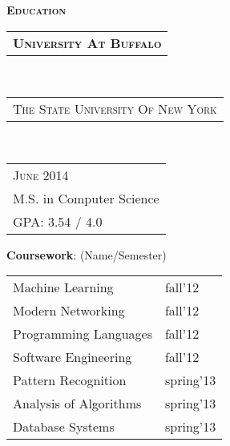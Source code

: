 \documentclass[10pt,a4paper,oneside]{article}
\begin{document}
    \hspace{2ex}
    \begin{minipage}[t]{0.33\textwidth}
        \vspace{0pt}
        \textcolor{light-gray}{\textbf{\large E\textsc{ducation}}}
        \vspace{10pt}\\
        \begin{tabular}{c}
            \textbf{\normalsize U\textsc{niversity} A\textsc{t} B\textsc{uffalo}}
        \end{tabular}\\
        \textcolor{light-gray}{
            \begin{tabular}{l}
                {\small T\textsc{he} S\textsc{tate} U\textsc{niversity} O\textsc{f} N\textsc{ew} Y\textsc{ork}}
            \end{tabular}
        }\\ 
        \begin{tabular}{l}
            {\small J\textsc{une} 2014}\\
            {\small M.S. in Computer Science }\\
            {\small GPA: 3.54 / 4.0}
        \end{tabular}
        \vspace{0pt}
        \begin{adjustwidth}{7pt}{0pt}
            {\small \textbf{Coursework}: (Name/Semester)}\\
        \end{adjustwidth}
        \vspace{-11pt}
        \begin{adjustwidth}{7pt}{0pt}
            \begin{tabular}{ll}
                { \footnotesize Machine Learning } & {\footnotesize fall'12}\\                
                { \footnotesize Modern Networking } & {\footnotesize fall'12}\\
                { \footnotesize Programming Languages } & {\footnotesize fall'12}\\
                { \footnotesize Software Engineering } & {\footnotesize fall'12}\\
                { \footnotesize Pattern Recognition } & {\footnotesize spring'13}\\
                { \footnotesize Analysis of Algorithms } & {\footnotesize spring'13}\\
                { \footnotesize Database Systems } & {\footnotesize spring'13}\\

\end{tabular}
\end{adjustwidth}
\end{minipage}
\end{document}
